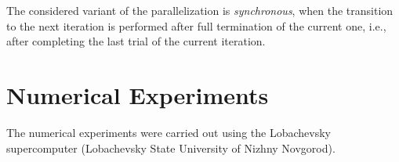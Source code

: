 \documentclass{svproc}
\begin{document}
The considered variant of the parallelization is \textit{synchronous}, when the transition to the next iteration is performed after full termination of the current one, i.e., after completing the last trial of the current iteration.


\section{Numerical Experiments}\label{Sec_Exp}

The numerical experiments were carried out using the Lobachevsky supercomputer (Lobachevsky State University of Nizhny Novgorod). 


\end{document}
